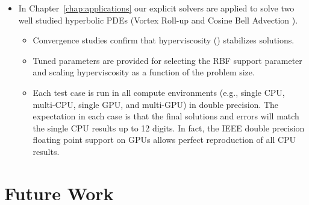 \begin{itemize}
\item In Chapter~\ref{chap:applications} our explicit solvers are applied to solve two well studied hyperbolic PDEs (Vortex Roll-up \cite{NairTransport05, NairJablonowski08} and Cosine Bell Advection \cite{JakobChien1995}).
\begin{itemize} 
\item Convergence studies confirm that hyperviscosity (\cite{Fornberg2011b}) stabilizes solutions.
\item Tuned parameters are provided for selecting the RBF support parameter and scaling hyperviscosity as a function of the problem size.
\item Each test case is run in all compute environments (e.g., single CPU, multi-CPU, single GPU, and multi-GPU) in double precision. The expectation in each case is that the final solutions and errors will match the single CPU results up to 12 digits. In fact, the IEEE double precision floating point support on GPUs allows perfect reproduction of all CPU results. 
\end{itemize}

\end{itemize} 



\section{Future Work}


